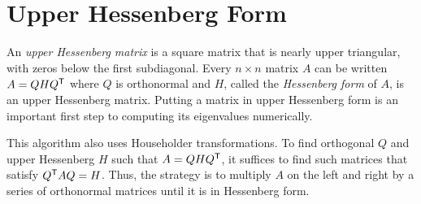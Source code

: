 \begin{comment}
\begin{info}
Householder QR factorization is more numerically stable than modified Gram-Schmidt.
However, modified Gram-Schmidt is still useful for some types of iterative methods because it finds the orthonormal basis one vector at a time instead of all at once.
\end{info}
\end{comment}

\section*{Upper Hessenberg Form} %

An \emph{upper Hessenberg matrix} is a square matrix that is nearly upper triangular, with zeros below the first subdiagonal.
Every $n \times n$ matrix $A$ can be written $A = QHQ^{\mathsf T}$ where $Q$ is orthonormal and $H$, called the \emph{Hessenberg form} of $A$, is an upper Hessenberg matrix.
Putting a matrix in upper Hessenberg form is an important first step to computing its eigenvalues numerically.

This algorithm also uses Householder transformations.
To find orthogonal $Q$ and upper Hessenberg $H$ such that $A = QHQ^{\mathsf T}$, it suffices to find such matrices that satisfy $Q^{\mathsf T} A Q = H$.
Thus, the strategy is to multiply $A$ on the left and right by a series of orthonormal matrices until it is in Hessenberg form.

